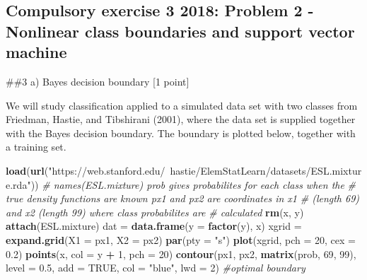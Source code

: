 \documentclass[]{article}
\newenvironment{Shaded}{\begin{snugshade}}{\end{snugshade}}
\newcommand{\CommentTok}[1]{\textcolor[rgb]{0.56,0.35,0.01}{\textit{#1}}}
\newcommand{\DataTypeTok}[1]{\textcolor[rgb]{0.13,0.29,0.53}{#1}}
\newcommand{\DecValTok}[1]{\textcolor[rgb]{0.00,0.00,0.81}{#1}}
\newcommand{\FloatTok}[1]{\textcolor[rgb]{0.00,0.00,0.81}{#1}}
\newcommand{\KeywordTok}[1]{\textcolor[rgb]{0.13,0.29,0.53}{\textbf{#1}}}
\newcommand{\NormalTok}[1]{#1}
\newcommand{\OperatorTok}[1]{\textcolor[rgb]{0.81,0.36,0.00}{\textbf{#1}}}
\newcommand{\OtherTok}[1]{\textcolor[rgb]{0.56,0.35,0.01}{#1}}
\newcommand{\StringTok}[1]{\textcolor[rgb]{0.31,0.60,0.02}{#1}}
\begin{document}
\hypertarget{compulsory-exercise-3-2018-problem-2---nonlinear-class-boundaries-and-support-vector-machine}{%
\subsection{Compulsory exercise 3 2018: Problem 2 - Nonlinear class
boundaries and support vector
machine}\label{compulsory-exercise-3-2018-problem-2---nonlinear-class-boundaries-and-support-vector-machine}}

\#\#3 a) Bayes decision boundary {[}1 point{]}

We will study classification applied to a simulated data set with two
classes from Friedman, Hastie, and Tibshirani (2001), where the data set
is supplied together with the Bayes decision boundary. The boundary is
plotted below, together with a training set.

\begin{Shaded}
\begin{Highlighting}[]
\KeywordTok{load}\NormalTok{(}\KeywordTok{url}\NormalTok{(}\StringTok{"https://web.stanford.edu/~hastie/ElemStatLearn/datasets/ESL.mixture.rda"}\NormalTok{))}
\CommentTok{# names(ESL.mixture) prob gives probabilites for each class when the}
\CommentTok{# true density functions are known px1 and px2 are coordinates in x1}
\CommentTok{# (length 69) and x2 (length 99) where class probabilites are}
\CommentTok{# calculated}
\KeywordTok{rm}\NormalTok{(x, y)}
\KeywordTok{attach}\NormalTok{(ESL.mixture)}
\NormalTok{dat =}\StringTok{ }\KeywordTok{data.frame}\NormalTok{(}\DataTypeTok{y =} \KeywordTok{factor}\NormalTok{(y), x)}
\NormalTok{xgrid =}\StringTok{ }\KeywordTok{expand.grid}\NormalTok{(}\DataTypeTok{X1 =}\NormalTok{ px1, }\DataTypeTok{X2 =}\NormalTok{ px2)}
\KeywordTok{par}\NormalTok{(}\DataTypeTok{pty =} \StringTok{"s"}\NormalTok{)}
\KeywordTok{plot}\NormalTok{(xgrid, }\DataTypeTok{pch =} \DecValTok{20}\NormalTok{, }\DataTypeTok{cex =} \FloatTok{0.2}\NormalTok{)}
\KeywordTok{points}\NormalTok{(x, }\DataTypeTok{col =}\NormalTok{ y }\OperatorTok{+}\StringTok{ }\DecValTok{1}\NormalTok{, }\DataTypeTok{pch =} \DecValTok{20}\NormalTok{)}
\KeywordTok{contour}\NormalTok{(px1, px2, }\KeywordTok{matrix}\NormalTok{(prob, }\DecValTok{69}\NormalTok{, }\DecValTok{99}\NormalTok{), }\DataTypeTok{level =} \FloatTok{0.5}\NormalTok{, }\DataTypeTok{add =} \OtherTok{TRUE}\NormalTok{, }\DataTypeTok{col =} \StringTok{"blue"}\NormalTok{, }
    \DataTypeTok{lwd =} \DecValTok{2}\NormalTok{)  }\CommentTok{#optimal boundary}
\end{Highlighting}
\end{Shaded}
\end{document}
